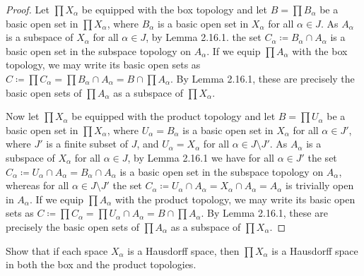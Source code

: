 \documentclass[a4paper,10pt]{article}
\begin{document}
\begin{solution}
    \begin{proof}
        Let $\prod X_\alpha$ be equipped with the box topology and let $B = \prod B_\alpha$ be a basic open set in $\prod X_\alpha$, where $B_\alpha$ is a basic open set in $X_\alpha$ for all $\alpha \in J$.
        As $A_\alpha$ is a subspace of $X_\alpha$ for all $\alpha \in J$, by Lemma 2.16.1. the set $C_\alpha \coloneq B_\alpha \cap A_\alpha$ is a basic open set in the subspace topology on $A_\alpha$.
        If we equip $\prod A_\alpha$ with the box topology, we may write its basic open sets as $C \coloneq \prod C_\alpha = \prod B_\alpha \cap A_\alpha = B \cap \prod A_\alpha$.
        By Lemma 2.16.1, these are precisely the basic open sets of $\prod A_\alpha$ as a subspace of $\prod X_\alpha$.

        Now let $\prod X_\alpha$ be equipped with the product topology and let $B = \prod U_\alpha$ be a basic open set in $\prod X_\alpha$, where $U_\alpha = B_\alpha$ is a basic open set in $X_\alpha$ for all $\alpha \in J'$, where $J'$ is a finite subset of $J$, and $U_\alpha = X_\alpha$ for all $\alpha \in J \setminus J'$.
        As $A_\alpha$ is a subspace of $X_\alpha$ for all $\alpha \in J$, by Lemma 2.16.1 we have for all $\alpha \in J'$ the set $C_\alpha \coloneq U_\alpha \cap A_\alpha = B_\alpha  \cap A_\alpha$ is a basic open set in the subspace topology on $A_\alpha$, whereas for all $\alpha \in J \setminus J'$ the set $C_\alpha \coloneq U_\alpha \cap A_\alpha = X_\alpha \cap A_\alpha = A_\alpha$ is trivially open in $A_\alpha$.
        If we equip $\prod A_\alpha$ with the product topology, we may write its basic open sets as $C \coloneq \prod C_\alpha = \prod U_\alpha \cap A_\alpha = B \cap \prod A_\alpha$.
        By Lemma 2.16.1, these are precisely the basic open sets of $\prod A_\alpha$ as a subspace of $\prod X_\alpha$.
    \end{proof}
\end{solution}
\newpage

\begin{exercise}[ID=2.19.3]
    Show that if each space $X_\alpha$ is a Hausdorff space, then $\prod X_\alpha$ is a Hausdorff space in both the box and the product topologies.
\end{exercise}
\end{document}
